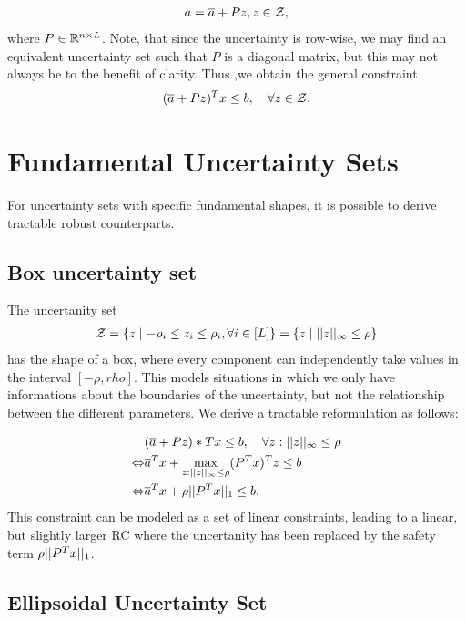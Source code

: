\begin{align*}
a = \overline{ a } + Pz, z\in\mathcal{Z},
\end{align*}
where $P\in\mathbb{R}^{n\times L}$. Note, that since the uncertainty is row-wise, we may find an equivalent uncertainty set such that $P$ is a diagonal matrix, but this may not always be to the benefit of clarity. Thus ,we obtain the general constraint
\begin{align*}
(\overline{ a }+Pz)^Tx\leq b, \quad \forall z\in\mathcal{Z}.
\end{align*}

\section{Fundamental Uncertainty Sets}

For uncertainty sets with specific fundamental shapes, it is possible to derive tractable robust counterparts.

\subsection{Box uncertainty set}

The uncertanity set
\begin{align*}
	\mathcal{Z} = \{z\mid -\rho_i\leq z_i\leq\rho_i, \forall i\in[L]\} = \{z\mid ||z||_\infty\leq\rho\}
\end{align*}
has the shape of  a box, where every component can independently take values in the interval $[-\rho,rho]$. This models situations in which we only have informations about the boundaries of the uncertainty, but not the relationship between the different parameters.
We derive a tractable reformulation as follows:

\begin{align*}
 & (\overline{ a }+Pz)*Tx\leq b, \quad\forall z: \vert\vert z \vert\vert_\infty\leq\rho \\
 \Leftrightarrow & \overline{ a }^Tx+\max\limits_{z:\vert\vert z \vert\vert_\infty\leq\rho} (P^Tx)^Tz\leq b \\
 \Leftrightarrow & \overline{ a }^Tx+\rho\vert\vert P^Tx \vert\vert_1 \leq b.
\end{align*}
This constraint can be modeled as a set of linear constraints, leading to a linear, but slightly larger RC where the uncertanity has been replaced by the safety term $\rho\vert\vert P^Tx \vert\vert_1$.

\subsection{Ellipsoidal Uncertainty Set}

